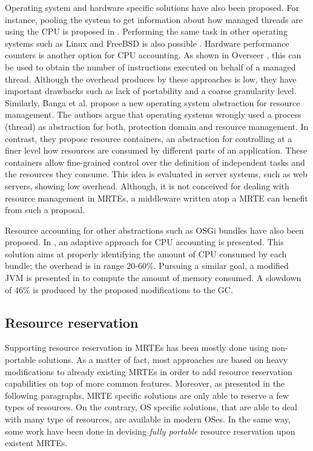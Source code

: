 Operating system and hardware specific solutions have also been proposed.
For instance, pooling the system to get information about how managed threads are using the CPU is proposed in \cite{czajkowski_jres:_1998}.
Performing the same task in other operating systems such as Linux and FreeBSD is also possible \cite{Soltesz:2007:COS:1272998.1273025, Kamp00jails:confining}.
Hardware performance counters is another option for CPU accounting.
As shown in Overseer \cite{DBLP:conf/pppj/PeternierBBP11}, this can be used to obtain the number of instructions executed on behalf of a managed thread.
Although the overhead produces by these approaches is low, they have important drawbacks such as lack of portability and a coarse granularity level.
Similarly, Banga et al. \cite{Banga:1999:RCN:296806.296810} propose a new operating system abstraction for resource management.
The authors argue that operating systems wrongly used a process (thread) as abstraction for both, protection domain and resource management.
In contrast, they propose resource containers, an abstraction for controlling at a finer level how resources are consumed by different parts of an application.
These containers allow fine-grained control over the definition of independent tasks and the resources they consume.
This idea is evaluated in server systems, such as web servers, showing low overhead.
Although, it is not conceived for dealing with resource management in MRTEs, a middleware written atop a MRTE can benefit from such a proposal.

Resource accounting for other abstractions such as OSGi bundles have also been proposed.
In \cite{Maurel:2012:AME:2304736.2304763}, an adaptive approach for CPU accounting is presented.
This solution aims at properly identifying the amount of CPU consumed by each bundle; the overhead is in range 20-60\%.
Pursuing a similar goal, a modified JVM is presented in \cite{Attouchi:2014:MMM:2602458.2602467} to compute the amount of memory consumed.
A slowdown of 46\% is produced by the proposed modifications to the GC.

\subsection{Resource reservation} \label{sec:resource-reservation-related}

Supporting resource reservation in MRTEs has been mostly done using non-portable solutions.
As a matter of fact, most approaches are based on heavy modifications to already existing MRTEs in order to add resource reservation capabilities on top of more common features.
Moreover, as presented in the following paragraphs, MRTE specific solutions are only able to reserve a few types of resources.
On the contrary, OS specific solutions, that are able to deal with many type of resources, are available in modern OSes.
In the same way, some work have been done in devising \textit{fully portable} resource reservation upon existent MRTEs.


